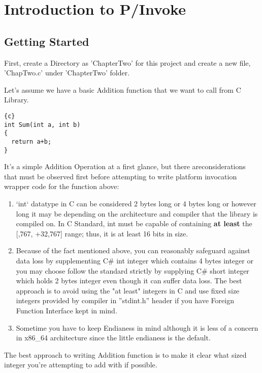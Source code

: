 \chapter{Introduction to P/Invoke}

\section{Getting Started}
First, create a Directory as 'ChapterTwo' for this project and create a new file, 'ChapTwo.c' under 'ChapterTwo' folder.

Let's assume we have a basic Addition function that we want to call from C Library.

\begin{lstlisting}{c}
int Sum(int a, int b)
{
  return a+b;
}
\end{lstlisting}

It's a simple Addition Operation at a first glance, but there are\newline considerations that must be observed first before attempting to write platform invocation wrapper code for the function above:

\begin{enumerate}
	\item `int` datatype in C can be considered 2 bytes long or 4 bytes long or however long it may be depending on the architecture and compiler that the library is compiled on. In C Standard, int must be capable of containing \textbf{at least} the [,767, +32,767] range; thus, it is at least 16 bits in size.
	
	\item Because of the fact mentioned above, you can reasonably safeguard against data loss by supplementing C\# int integer which contains 4 bytes integer or you may choose follow the standard strictly by supplying C\# short integer which holds 2 bytes integer even though it can suffer data loss. The best approach is to avoid using the "at least" integers in C and use fixed size integers provided by compiler in ''stdint.h'' header if you have Foreign Function Interface kept in mind.
	
	\item Sometime you have to keep Endianess in mind although it is less of a concern in x86\_64 architecture since the little endianess is the default.
\end{enumerate}
\newpage
The best approach to writing Addition function is to make it clear what sized integer you're attempting to add with if possible.

